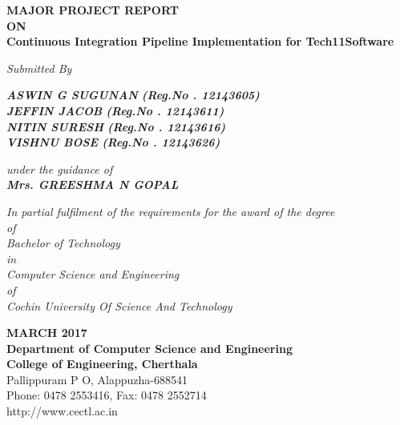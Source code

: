\documentclass[12pt,a4paper,oneside]{report}
\begin{document}
\begin{titlepage}
\begin{center}
\begin{singlespace}
\Large{\textbf{MAJOR PROJECT REPORT}}\\
\Large{\textbf{ON}}\\
\LARGE{\textbf{Continuous Integration Pipeline Implementation for Tech11Software }}\\
\end{singlespace}
\large{\textit{Submitted By }}\\
\begin{singlespace}
\Large{\textit{\textbf{ASWIN G SUGUNAN }\textbf{(Reg.No . 12143605)}}} \\
\Large{\textit{\textbf{JEFFIN JACOB  }\textbf{(Reg.No . 12143611)}}} \\
\Large{\textit{\textbf{NITIN SURESH }\textbf{(Reg.No . 12143616)}}} \\
\Large{\textit{\textbf{VISHNU BOSE }\textbf{(Reg.No . 12143626)}}} \\

\end{singlespace}
\large{\textit{\textit{under the guidance of}}}\\
\Large{\textit{\textbf{Mrs. GREESHMA N GOPAL}}}\\
\begin{singlespace}
\large{\textit{In partial fulfilment of the requirements for the award of the degree}\\
\large{ \textit{of}}\\
\large{\textit{Bachelor of Technology} }\\
\large{\textit{in}}\\
\large{\textit{Computer Science and Engineering}}\\
\large{\textit{of}}\\
\large{\textit{Cochin University Of Science And Technology}}}
\end{singlespace}
\begin{singlespace}
\begin{figure}[h]
\begin{center}
\end{center}
\end{figure}
\Large{{\textbf{MARCH 2017\\Department of Computer Science and Engineering\\College of Engineering, Cherthala}\\Pallippuram P O, Alappuzha-688541 \\Phone: 0478 2553416, Fax: 0478 2552714 \\ http://www.cectl.ac.in}}
\end{singlespace}
\end{center}
\end{titlepage}
\end{document}
